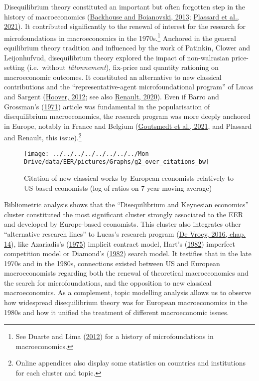 \documentclass[
  12pt,
  onecolumn]{article}
\begin{document}
Disequilibrium theory constituted an important but often forgotten step
in the history of macroeconomics
(\protect\hyperlink{ref-backhouseboianovski2013}{Backhouse and
Boianovski, 2013}; \protect\hyperlink{ref-plassard2021}{Plassard et al.,
2021}). It contributed significantly to the renewal of interest for the
research for microfoundations in macroeconomics in the 1970s.\footnote{See
  Duarte and Lima (\protect\hyperlink{ref-duartelima2012a}{2012}) for a
  history of microfoundations in macroeconomics.} Anchored in the
general equilibrium theory tradition and influenced by the work of
Patinkin, Clower and Leijonhufvud, disequilibrium theory explored the
impact of non-walrasian price-setting (i.e.~without \emph{tâtonnement}),
fix-price and quantity rationing on macroeconomic outcomes. It
constituted an alternative to new classical contributions and the
``representative-agent microfoundational program'' of Lucas and Sargent
(\protect\hyperlink{ref-hoover2012}{Hoover, 2012}; see also
\protect\hyperlink{ref-renault2020a}{Renault, 2020}). Even if Barro and
Grossman's (\protect\hyperlink{ref-barro1971}{1971}) article was
fundamental in the popularisation of disequilibrium macroeconomics, the
research program was more deeply anchored in Europe, notably in France
and Belgium (\protect\hyperlink{ref-goutsmedt2021}{Goutsmedt et al.,
2021}, and Plassard and Renault, this issue).\footnote{Online appendices
  also display some statistics on countries and institutions for each
  cluster and topic.}

\begin{figure}[h]

{\centering \texttt{[image: ../../../../../../../../Mon Drive/data/EER/pictures/Graphs/g2\_over\_citations\_bw]} 

}

\caption{Citation of new classical works by European economists relatively to US-based economists (log of ratios on 7-year moving average)}\label{fig:plot-new-classical}
\end{figure}

Bibliometric analysis shows that the ``Disequilibrium and Keynesian
economics'' cluster constituted the most significant cluster strongly
associated to the EER and developed by Europe-based economists. This
cluster also integrates other ``alternative research lines'' to Lucas's
research program (\protect\hyperlink{ref-devroey2016}{De Vroey, 2016,
chap. 14}), like Azariadis's
(\protect\hyperlink{ref-azariadis1975}{1975}) implicit contract model,
Hart's (\protect\hyperlink{ref-hart1982}{1982}) imperfect competition
model or Diamond's (\protect\hyperlink{ref-diamond1982}{1982}) search
model. It testifies that in the late 1970s and in the 1980s, connections
existed between US and European macroeconomists regarding both the
renewal of theoretical macroeconomics and the search for
microfoundations, and the opposition to new classical macroeconomics. As
a complement, topic modelling analysis allows us to observe how
widespread disequilibrium theory was for European macroeconomics in the
1980s and how it unified the treatment of different macroeconomic
issues.
\end{document}
